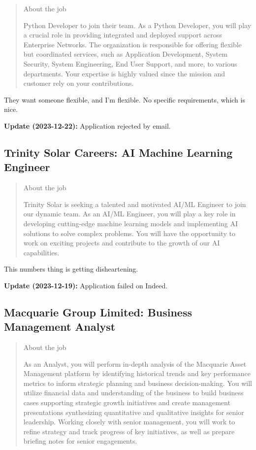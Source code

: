\documentclass[
	letterpaper, %
	12pt, %
]{CSSullivanBusinessReport}
\begin{document}
\begin{quote}
	About the job
	
	Python Developer to join their team. As a Python Developer, you will play a crucial role in providing integrated and deployed support across Enterprise Networks. The organization is responsible for offering flexible but coordinated services, such as Application Development, System Security, System Engineering, End User Support, and more, to various departments. Your expertise is highly valued since the mission and customer rely on your contributions.

\end{quote}

They want someone flexible, and I'm flexible. No specific requirements, which is nice. 

\textbf{Update (2023-12-22):} Application rejected by email.



\subsection[Trinity Solar Careers]{Trinity Solar Careers: AI Machine Learning Engineer}

\begin{quote}
	About the job
	
	Trinity Solar is seeking a talented and motivated AI/ML Engineer to join our dynamic team. As an AI/ML Engineer, you will play a key role in developing cutting-edge machine learning models and implementing AI solutions to solve complex problems. You will have the opportunity to work on exciting projects and contribute to the growth of our AI capabilities.

\end{quote}

This numbers thing is getting disheartening. 

\textbf{Update (2023-12-19):} Application failed on Indeed.


\subsection[Macquarie Group Limited]{Macquarie Group Limited: Business Management Analyst}

\begin{quote}
	About the job
	
	As an Analyst, you will perform in-depth analysis of the Macquarie Asset Management platform by identifying historical trends and key performance metrics to inform strategic planning and business decision-making. You will utilize financial data and understanding of the business to build business cases supporting strategic growth initiatives and create management presentations synthesizing quantitative and qualitative insights for senior leadership. Working closely with senior management, you will work to refine strategy and track progress of key initiatives, as well as prepare briefing notes for senior engagements.

\end{quote}
\end{document}
